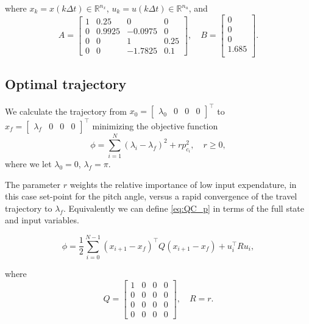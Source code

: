 where $x_k = x(k\Delta t) \in \mathbb{R}^{n_x}$, $u_k = u(k\Delta t)\in \mathbb{R}^{n_u}$, and
\begin{equation}
	A = 
	\begin{bmatrix}
		1 & 0.25 & 0 & 0 \\
		0 & 0.9925 & -0.0975 & 0 \\
		0 & 0 & 1 & 0.25 \\
		0 & 0 & -1.7825 & 0.1
	\end{bmatrix}, \quad
	B = 
	\begin{bmatrix}
		0 \\
		0 \\
		0 \\
		1.685 \\
	\end{bmatrix}.
\end{equation}

\subsection{Optimal trajectory}

We calculate the trajectory from $x_0 = \begin{bmatrix}\lambda_0&0&0&0\end{bmatrix}^\top$ to $x_f = \begin{bmatrix}\lambda_f&0&0&0\end{bmatrix}^\top$ minimizing the objective function 
\begin{equation}
\label{eq:QC_p}
	\phi = \sum_{i=1}^{N}(\lambda_i - \lambda_f)^2 + rp^2_{c_i}, \quad r \ge 0,
\end{equation}
where we let $\lambda_0 = 0$, $\lambda_f = \pi$.

The parameter $r$ weights the relative importance of low input expendature, in this case set-point for the pitch angle, versus a rapid convergence of the travel trajectory to $\lambda_f$.  Equivalently we can define \eqref{eq:QC_p} in terms of the full state and input variables.

\begin{equation}
	\label{eq:QC_p_QR}
	\phi = \frac{1}{2}\sum_{i=0}^{N-1} (x_{i+1}-x_f)^\top Q (x_{i+1}-x_f) + u_i^\top R u_i,
\end{equation}

where
\begin{equation*}
Q = \begin{bmatrix}1&0&0&0\\0&0&0&0\\0&0&0&0\\0&0&0&0\end{bmatrix}, \quad R = r.
\end{equation*}

